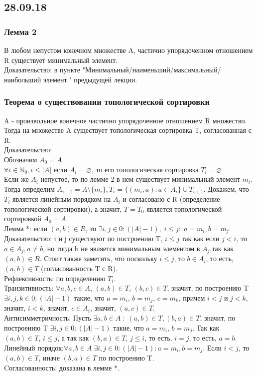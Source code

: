 \subsection{28.09.18}
\subsubsection{Лемма 2}
В любом непустом конечном множестве A, частично упорядоченном отношением R существует минимальный элемент. \\
Доказательство: в пункте "Минимальный/наименьший/максимальный/наибольший элемент." предыдущей лекции.
\subsubsection{Теорема о существовании топологической сортировки}
A - произвольное конечное частично упорядоченное отношением R множество. Тогда на множестве A существует топологическая сортировка T, согласованная с R.\\
Доказательство:\\
Обозначим $A_0 = A$.\\
$\forall i \in \mathbb{N}_0, i \leq |A|$ если $A_i = \varnothing$, то его топологическая сортировка $T_i = \varnothing$\\
Если же $A_i$ непустое, то по лемме 2 в нем существует минимальный элемент $m_i$. Тогда определим $A_{i + 1} = A \setminus \{m_i\}, T_i = \{(m_i, a) : a \in A_{i}\} \cup T_{i + 1}$. Докажем, что $T_i$ является линейным порядком на $A_i$ и согласовано с R (определение топологической сортировки), а значит, $T = T_0$ является топологической сортировкой $A_0 = A$.\\
Лемма *: если $(a, b) \in R$, то $\exists i, j \in 0:(|A| - 1), \; i \leq j: \; a = m_i, b = m_j$. Доказательство: i и j существуют по построению T, $i \leq j$ так как если $j < i$, то $a \in A_j, a \not= b$, но тогда b не является минимальным элементом в $A_j$,так как $(a, b) \in R$. Стоит также заметить, что поскольку $i \leq j$, то $b \in A_i$, то есть, $(a, b) \in T$ (cогласованность T с R).\\
Рефлексивность: по определению $T_i$.\\
Транзитивность: $\forall a, b, c \in A$, $(a, b) \in T$, $(b, c) \in T$, значит, по построению T $\exists i, j, k \in 0:(|A| - 1)$ такие, что $a = m_i$, $b = m_j$, $c = m_k$, причем $i < j$ и $j < k$, значит, $i < k$, значит, $c \in A_i$, значит, $(a, c) \in T$.\\
Антисимметричность: Пусть $\exists a, b \in A \; : \; (a, b) \in T, (b, a) \in T$, значит, по построению T $\exists i, j \in 0:(|A| - 1)$ такие, что $a = m_i$, $b = m_j$. Так как $(a, b) \in T$, $i \leq j$, а так как $(b, a) \in T$, $j \leq i$, то есть, $i = j$, то есть, $a = b$. \\
Линейный порядок:$\forall a, b \in A \; \exists i, j \in 0:(|A| - 1): a = m_i, b = m_j$. Если $i < j$, то $(a, b) \in T$, иначе $(b, a) \in T$ по построению T. \\
Cогласованность: доказана в лемме *.
